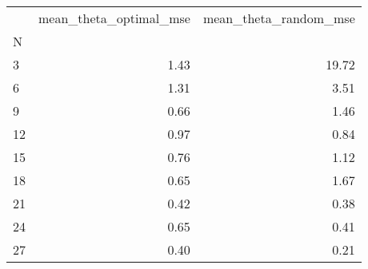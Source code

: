 \begin{tabular}{lrr}
\toprule
{} &  mean\_theta\_optimal\_mse &  mean\_theta\_random\_mse \\
N  &                         &                        \\
\midrule
3  &                    1.43 &                  19.72 \\
6  &                    1.31 &                   3.51 \\
9  &                    0.66 &                   1.46 \\
12 &                    0.97 &                   0.84 \\
15 &                    0.76 &                   1.12 \\
18 &                    0.65 &                   1.67 \\
21 &                    0.42 &                   0.38 \\
24 &                    0.65 &                   0.41 \\
27 &                    0.40 &                   0.21 \\
\bottomrule
\end{tabular}
